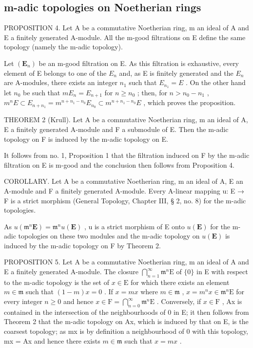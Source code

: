\subsection{m-adic topologies on Noetherian rings}

PROPOSITION 4. Let A be a commutative Noetherian ring, m an ideal of A and E a finitely generated A-module. All the m-good filtrations on E define the same topology (namely the m-adic topology).

Let \((\mathbf{E}_{n})\) be an m-good filtration on E. As this filtration is exhaustive, every element of E belongs to one of the \(E_{n}\) and, as E is finitely generated and the \(E_{n}\) are A-modules, there exists an integer \(n_{1}\) such that \(E_{n_{1}} = E\) . On the other hand let \(n_{0}\) be such that \(mE_{n} = E_{n+1}\) for \(n \geqslant n_{0}\) ; then, for \(n > n_{0} - n_{1}\) , \(m^{n}E \subset E_{n+n_{1}} = m^{n+n_{1}-n_{0}}E_{n_{0}} \subset m^{n+n_{1}-n_{0}}E\) , which proves the proposition.

THEOREM 2 (Krull). Let A be a commutative Noetherian ring, m an ideal of A, E a finitely generated A-module and F a submodule of E. Then the m-adic topology on F is induced by the m-adic topology on E.

It follows from no. 1, Proposition 1 that the filtration induced on F by the m-adic filtration on E is m-good and the conclusion then follows from Proposition 4.

COROLLARY. Let A be a commutative Noetherian ring, m an ideal of A, E an A-module and F a finitely generated A-module. Every A-linear mapping u: E → F is a strict morphism (General Topology, Chapter III, § 2, no. 8) for the m-adic topologies.

As \(u(\mathfrak{m}^{n}\mathbf{E}) = \mathfrak{m}^{n}u(\mathbf{E})\) , u is a strict morphism of E onto \(u(\mathbf{E})\) for the m-adic topologies on these two modules and the m-adic topology on \(u(\mathbf{E})\) is induced by the m-adic topology on F by Theorem 2.

PROPOSITION 5. Let A be a commutative Noetherian ring, m an ideal of A and E a finitely generated A-module. The closure \(\bigcap_{n=1}^{\infty} \mathfrak{m}^{n}\mathrm{E}\) of \(\{0\}\) in E with respect to the m-adic topology is the set of \(x \in \mathrm{E}\) for which there exists an element \(m \in \mathfrak{m}\) such that \((1 - m)x = 0\) . If \(x = mx\) where \(m \in \mathfrak{m}\) , \(x = m^{n}x \in \mathfrak{m}^{n}\mathrm{E}\) for every integer \(n \geqslant 0\) and hence \(x \in \mathrm{F} = \bigcap_{n=0}^{\infty} \mathfrak{m}^{n}\mathrm{E}\) . Conversely, if \(x \in \mathrm{F}\) , Ax is contained in the intersection of the neighbourhoods of 0 in E; it then follows from Theorem 2 that the m-adic topology on Ax, which is induced by that on E, is the coarsest topology; as mx is by definition a neighbourhood of 0 with this topology, mx = Ax and hence there exists \(m \in \mathfrak{m}\) such that \(x = mx\) .

